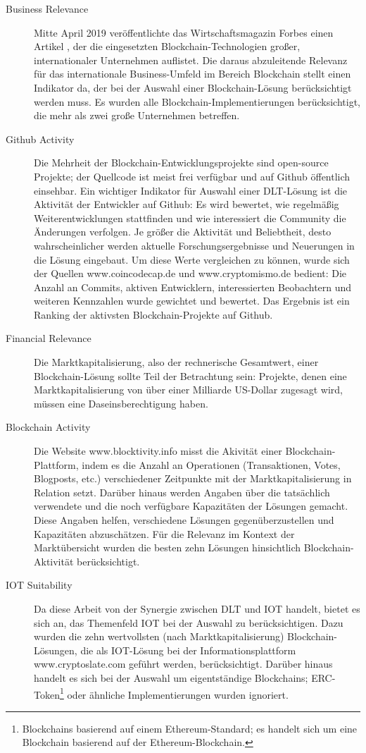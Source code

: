 \begin{description}
  \item[Business Relevance] Mitte April 2019 veröffentlichte das Wirtschaftsmagazin Forbes einen Artikel \cite{castillo2019}, der die eingesetzten Blockchain-Technologien großer, internationaler Unternehmen auflistet. Die daraus abzuleitende Relevanz für das internationale Business-Umfeld im Bereich Blockchain stellt einen Indikator da, der bei der Auswahl einer Blockchain-Lösung berücksichtigt werden muss. Es wurden alle Blockchain-Implementierungen berücksichtigt, die mehr als zwei große Unternehmen betreffen.
  \item[Github Activity] Die Mehrheit der Blockchain-Entwicklungsprojekte sind open-source Projekte; der Quellcode ist meist frei verfügbar und auf Github öffentlich einsehbar. Ein wichtiger Indikator für Auswahl einer \ac{DLT}-Lösung ist die Aktivität der Entwickler auf Github: Es wird bewertet, wie regelmäßig Weiterentwicklungen stattfinden und wie interessiert die Community die Änderungen verfolgen. Je größer die Aktivität und Beliebtheit, desto wahrscheinlicher werden aktuelle Forschungsergebnisse und Neuerungen in die Lösung eingebaut. Um diese Werte vergleichen zu können, wurde sich der Quellen www.coincodecap.de und www.cryptomismo.de bedient: Die Anzahl an Commits, aktiven Entwicklern, interessierten Beobachtern und weiteren Kennzahlen wurde gewichtet und bewertet. Das Ergebnis ist ein Ranking der aktivsten Blockchain-Projekte auf Github.
  \item[Financial Relevance] Die Marktkapitalisierung, also der rechnerische Gesamtwert, einer Blockchain-Lösung sollte Teil der Betrachtung sein: Projekte, denen eine Marktkapitalisierung von über einer Milliarde US-Dollar zugesagt wird, müssen eine Daseinsberechtigung haben.
  \item[Blockchain Activity] Die Website www.blocktivity.info misst die Akivität einer Blockchain-Plattform, indem es die Anzahl an Operationen (Transaktionen, Votes, Blogposts, etc.) verschiedener Zeitpunkte mit der Marktkapitalisierung in Relation setzt. Darüber hinaus werden Angaben über die tatsächlich verwendete und die noch verfügbare Kapazitäten der Lösungen gemacht. Diese Angaben helfen, verschiedene Lösungen gegenüberzustellen und Kapazitäten abzuschätzen. Für die Relevanz im Kontext der Marktübersicht wurden die besten zehn Lösungen hinsichtlich Blockchain-Aktivität berücksichtigt.
  \item[IOT Suitability] Da diese Arbeit von der Synergie zwischen \ac{DLT} und \ac{IOT} handelt, bietet es sich an, das Themenfeld \ac{IOT} bei der Auswahl zu berücksichtigen. Dazu wurden die zehn wertvollsten (nach Marktkapitalisierung) Blockchain-Lösungen, die als \ac{IOT}-Lösung bei der Informationsplattform www.cryptoslate.com geführt werden, berücksichtigt. Darüber hinaus handelt es sich bei der Auswahl um eigentständige Blockchains; ERC-Token\footnote{Blockchains basierend auf einem Ethereum-Standard; es handelt sich um eine Blockchain basierend auf der Ethereum-Blockchain.} oder ähnliche Implementierungen wurden ignoriert.
\end{description}

